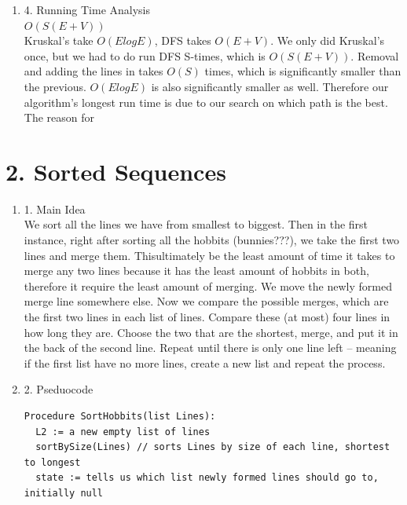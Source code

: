 \documentclass[11pt]{article}
\newenvironment{qparts}{\begin{enumerate}[{(}a{)}]}{\end{enumerate}}
\begin{document}
\begin{qparts}
\item[4.] Running Time Analysis \\
$O(S(E+V))$ \\

Kruskal's take $O(ElogE)$, DFS takes $O(E+V)$. We only did Kruskal's once, but we had to do run DFS S-times, which is $O(S(E+V))$. Removal and adding the lines in takes $O(S)$ times, which is significantly smaller than the previous. $O(ElogE)$ is also significantly smaller as well. Therefore our algorithm's longest run time is due to our search on which path is the best. 
The reason for 
\end{qparts}
\newpage
\section*{2. Sorted Sequences}
\begin{qparts}
\item[1.] Main Idea \\
We sort all the lines we have from smallest to biggest. Then in the first instance, right after sorting all the hobbits (bunnies???), we take the first two lines and merge them. Thisultimately be the least amount of time it takes to merge any two lines because it has the least amount of hobbits in both, therefore it require the least amount of merging. We move the newly formed merge line somewhere else. Now we compare the possible merges, which are the first two lines in each list of lines. Compare these (at most) four lines in how long they are. Choose the two that are the shortest, merge, and put it in the back of the second line. Repeat until there is only one line left -- meaning if the first list have no more lines, create a new list and repeat the process. 
\item[2.] Pseduocode
\begin{verbatim}
Procedure SortHobbits(list Lines):
  L2 := a new empty list of lines
  sortBySize(Lines) // sorts Lines by size of each line, shortest to longest
  state := tells us which list newly formed lines should go to, initially null
    

\end{verbatim}
\end{qparts}
\end{document}
